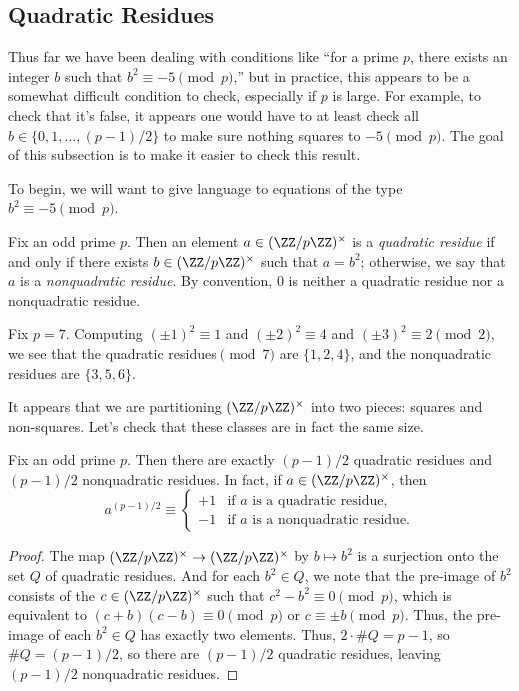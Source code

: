 \documentclass[../notes.tex]{subfiles}
\begin{document}
\subsection{Quadratic Residues}
Thus far we have been dealing with conditions like ``for a prime $p$, there exists an integer $b$ such that $b^2\equiv-5\pmod p$,'' but in practice, this appears to be a somewhat difficult condition to check, especially if $p$ is large. For example, to check that it's false, it appears one would have to at least check all $b\in\{0,1,\ldots,(p-1)/2\}$ to make sure nothing squares to $-5\pmod p$. The goal of this subsection is to make it easier to check this result.

To begin, we will want to give language to equations of the type $b^2\equiv-5\pmod p$.
\begin{definition}
	Fix an odd prime $p$. Then an element $a\in(\ZZ/p\ZZ)^\times$ is a \textit{quadratic residue} if and only if there exists $b\in(\ZZ/p\ZZ)^\times$ such that $a=b^2$; otherwise, we say that $a$ is a \textit{nonquadratic residue}. By convention, $0$ is neither a quadratic residue nor a nonquadratic residue.
\end{definition}
\begin{example} \label{eq:qrs-of-7}
	Fix $p=7$. Computing $(\pm1)^2\equiv1$ and $(\pm2)^2\equiv4$ and $(\pm3)^2\equiv2\pmod2$, we see that the quadratic residues$\pmod7$ are $\{1,2,4\}$, and the nonquadratic residues are $\{3,5,6\}$.
\end{example}
It appears that we are partitioning $(\ZZ/p\ZZ)^\times$ into two pieces: squares and non-squares. Let's check that these classes are in fact the same size.
\begin{lemma} \label{lem:half-qrs}
	Fix an odd prime $p$. Then there are exactly $(p-1)/2$ quadratic residues and $(p-1)/2$ nonquadratic residues. In fact, if $a\in(\ZZ/p\ZZ)^\times$, then
	\[a^{(p-1)/2}\equiv\begin{cases}
		+1 & \text{if }a\text{ is a quadratic residue}, \\
		-1 & \text{if }a\text{ is a nonquadratic residue}.
	\end{cases}\]
\end{lemma}
\begin{proof}
	The map $(\ZZ/p\ZZ)^\times\to(\ZZ/p\ZZ)^\times$ by $b\mapsto b^2$ is a surjection onto the set $Q$ of quadratic residues. And for each $b^2\in Q$, we note that the pre-image of $b^2$ consists of the $c\in(\ZZ/p\ZZ)^\times$ such that $c^2-b^2\equiv0\pmod p$, which is equivalent to $(c+b)(c-b)\equiv0\pmod p$ or $c\equiv\pm b\pmod p$. Thus, the pre-image of each $b^2\in Q$ has exactly two elements. Thus, $2\cdot\#Q=p-1$, so $\#Q=(p-1)/2$, so there are $(p-1)/2$ quadratic residues, leaving $(p-1)/2$ nonquadratic residues.
\end{proof}
\end{document}
